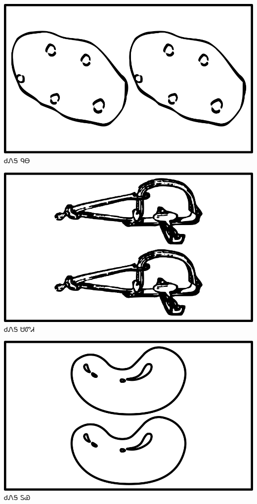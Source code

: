 \documentclass[avery5371]{flashcards}%
\begin{document}
    \begin{flashcard}{
        \includegraphics[width=0.95\columnwidth,height=.51\columnwidth,keepaspectratio]{../artwork/objects-neutral/tali-nuna}
    }
        \Huge ᏧᏁᎦ ᏄᎾ
    \end{flashcard}

    \begin{flashcard}{
        \includegraphics[width=0.95\columnwidth,height=.51\columnwidth,keepaspectratio]{../artwork/objects-neutral/tali-sadvdi}
    }
        \Huge ᏧᏁᎦ ᏌᏛᏗ
    \end{flashcard}

    \begin{flashcard}{
        \includegraphics[width=0.95\columnwidth,height=.51\columnwidth,keepaspectratio]{../artwork/objects-neutral/tali-tuya}
    }
        \Huge ᏧᏁᎦ ᏚᏯ
    \end{flashcard}
\end{document}
